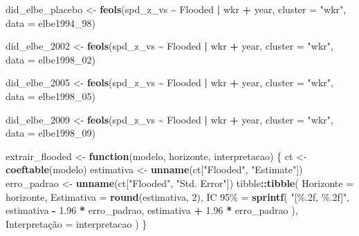 \documentclass[
]{article}
\newenvironment{Shaded}{\begin{snugshade}}{\end{snugshade}}
\newcommand{\AttributeTok}[1]{\textcolor[rgb]{0.13,0.29,0.53}{#1}}
\newcommand{\ControlFlowTok}[1]{\textcolor[rgb]{0.13,0.29,0.53}{\textbf{#1}}}
\newcommand{\DecValTok}[1]{\textcolor[rgb]{0.00,0.00,0.81}{#1}}
\newcommand{\FloatTok}[1]{\textcolor[rgb]{0.00,0.00,0.81}{#1}}
\newcommand{\FunctionTok}[1]{\textcolor[rgb]{0.13,0.29,0.53}{\textbf{#1}}}
\newcommand{\NormalTok}[1]{#1}
\newcommand{\OtherTok}[1]{\textcolor[rgb]{0.56,0.35,0.01}{#1}}
\newcommand{\SpecialCharTok}[1]{\textcolor[rgb]{0.81,0.36,0.00}{\textbf{#1}}}
\newcommand{\StringTok}[1]{\textcolor[rgb]{0.31,0.60,0.02}{#1}}
\begin{document}
\begin{Shaded}
\begin{Highlighting}[]
\NormalTok{did\_elbe\_placebo }\OtherTok{\textless{}{-}} \FunctionTok{feols}\NormalTok{(spd\_z\_vs }\SpecialCharTok{\textasciitilde{}}\NormalTok{ Flooded }\SpecialCharTok{|}\NormalTok{ wkr }\SpecialCharTok{+}\NormalTok{ year,}
                          \AttributeTok{cluster =} \StringTok{"wkr"}\NormalTok{,}
                          \AttributeTok{data =}\NormalTok{ elbe1994\_98)}

\NormalTok{did\_elbe\_2002 }\OtherTok{\textless{}{-}} \FunctionTok{feols}\NormalTok{(spd\_z\_vs }\SpecialCharTok{\textasciitilde{}}\NormalTok{ Flooded }\SpecialCharTok{|}\NormalTok{ wkr }\SpecialCharTok{+}\NormalTok{ year,}
                       \AttributeTok{cluster =} \StringTok{"wkr"}\NormalTok{,}
                       \AttributeTok{data =}\NormalTok{ elbe1998\_02)}

\NormalTok{did\_elbe\_2005 }\OtherTok{\textless{}{-}} \FunctionTok{feols}\NormalTok{(spd\_z\_vs }\SpecialCharTok{\textasciitilde{}}\NormalTok{ Flooded }\SpecialCharTok{|}\NormalTok{ wkr }\SpecialCharTok{+}\NormalTok{ year,}
                       \AttributeTok{cluster =} \StringTok{"wkr"}\NormalTok{,}
                       \AttributeTok{data =}\NormalTok{ elbe1998\_05)}

\NormalTok{did\_elbe\_2009 }\OtherTok{\textless{}{-}} \FunctionTok{feols}\NormalTok{(spd\_z\_vs }\SpecialCharTok{\textasciitilde{}}\NormalTok{ Flooded }\SpecialCharTok{|}\NormalTok{ wkr }\SpecialCharTok{+}\NormalTok{ year,}
                       \AttributeTok{cluster =} \StringTok{"wkr"}\NormalTok{,}
                       \AttributeTok{data =}\NormalTok{ elbe1998\_09)}

\NormalTok{extrair\_flooded }\OtherTok{\textless{}{-}} \ControlFlowTok{function}\NormalTok{(modelo, horizonte, interpretacao) \{}
\NormalTok{  ct }\OtherTok{\textless{}{-}} \FunctionTok{coeftable}\NormalTok{(modelo)}
\NormalTok{  estimativa }\OtherTok{\textless{}{-}} \FunctionTok{unname}\NormalTok{(ct[}\StringTok{"Flooded"}\NormalTok{, }\StringTok{"Estimate"}\NormalTok{])}
\NormalTok{  erro\_padrao }\OtherTok{\textless{}{-}} \FunctionTok{unname}\NormalTok{(ct[}\StringTok{"Flooded"}\NormalTok{, }\StringTok{"Std. Error"}\NormalTok{])}
\NormalTok{  tibble}\SpecialCharTok{::}\FunctionTok{tibble}\NormalTok{(}
    \AttributeTok{Horizonte =}\NormalTok{ horizonte,}
    \AttributeTok{Estimativa =} \FunctionTok{round}\NormalTok{(estimativa, }\DecValTok{2}\NormalTok{),}
    \StringTok{\textasciigrave{}}\AttributeTok{IC 95\%}\StringTok{\textasciigrave{}} \OtherTok{=} \FunctionTok{sprintf}\NormalTok{(}
      \StringTok{"[\%.2f, \%.2f]"}\NormalTok{,}
\NormalTok{      estimativa }\SpecialCharTok{{-}} \FloatTok{1.96} \SpecialCharTok{*}\NormalTok{ erro\_padrao,}
\NormalTok{      estimativa }\SpecialCharTok{+} \FloatTok{1.96} \SpecialCharTok{*}\NormalTok{ erro\_padrao}
\NormalTok{    ),}
\NormalTok{    Interpretação }\OtherTok{=}\NormalTok{ interpretacao}
\NormalTok{  )}
\NormalTok{\}}


\end{Highlighting}
\end{Shaded}
\end{document}
